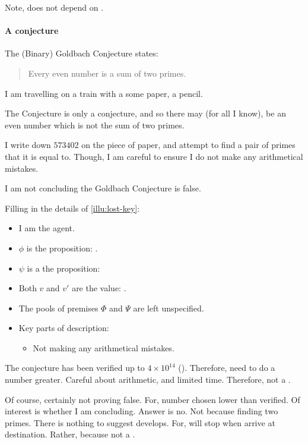 \begin{note}
  Note, does not depend on .
\end{note}

\paragraph*{A conjecture}

\begin{note}
  \begin{illustration}%
    The (Binary) Goldbach Conjecture states:

    \begin{quote}
      Every even number is a sum of two primes.
    \end{quote}

    I am travelling on a train with a some paper, a pencil.

    The Conjecture is only a conjecture, and so there may (for all I know), be an even number which is not the sum of two primes.

    I write down \(573402\) on the piece of paper, and attempt to find a pair of primes that it is equal to.
    Though, I am careful to ensure I do not make any arithmetical mistakes.

    I am not concluding the Goldbach Conjecture is false.
  \end{illustration}

  Filling in the details of \autoref{illu:lost-key}:

  \begin{itemize}[noitemsep]
  \item
    I am the agent.
  \item
    \(\phi\) is the proposition: .
  \item
    \(\psi\) is a the proposition: 
  \item
    Both \(v\) and \(v'\) are the value: .
  \item
    The pools of premises \(\Phi\) and \(\Psi\) are left unspecified.
  \item
    Key parts of description:
    \begin{itemize}
    \item
      Not making any arithmetical mistakes.
    \end{itemize}
  \end{itemize}

  The conjecture has been verified up to \(4 \times 10^{14}\) (\cite[cf.][]{Richstein:2001aa}).
  Therefore, need to do a number greater.
  Careful about arithmetic, and limited time.
  Therefore, not a .

  Of course, certainly not proving false.
  For, number chosen lower than verified.
  Of interest is whether I am concluding.
  Answer is no.
  Not because finding two primes.
  There is nothing to suggest develops.
  For, will stop when arrive at destination.
  Rather, because not a .
\end{note}

